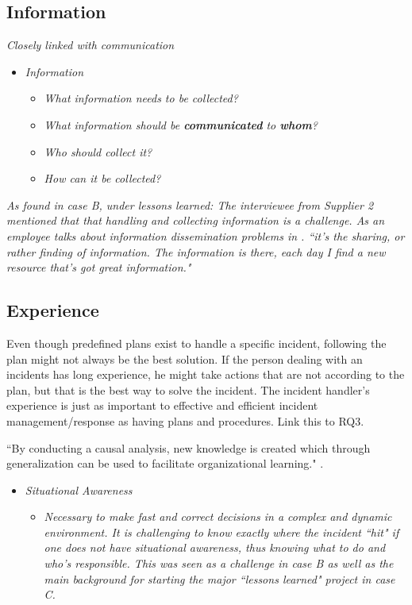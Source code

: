 \subsection{Information}
\textit{Closely linked with communication}

\begin{itemize}
\item \textit{Information}
\begin{itemize}
\item \textit{What information needs to be collected?}
\item \textit{What information should be \textbf{communicated} to \textbf{whom}?}
\item \textit{Who should collect it?}
\item \textit{How can it be collected?}
\end{itemize}
\end{itemize}

\textit{As found in case B, under lessons learned:
The interviewee from Supplier 2 mentioned that that handling and collecting information is a challenge. As an employee talks about information dissemination problems in \cite{ahmad2012incident}.
``it's the sharing, or rather finding of information. The information is there, each day I find a new resource that's got great information."}

\subsection{Experience}

Even though predefined plans exist to handle a specific incident, following the plan might not always be the best solution. If the person dealing with an incidents has long experience, he might take actions that are not according to the plan, but that is the best way to solve the incident. The incident handler's experience is just as important to effective and efficient incident management/response as having plans and procedures. Link this to RQ3.

``By conducting a causal analysis, new knowledge is created which through generalization can be used to facilitate organizational learning."\cite{werlinger2010preparation}
.

\begin{itemize}
\item \textit{Situational Awareness}
\begin{itemize}
\item\textit{ Necessary to make fast and correct decisions in a complex and dynamic environment. It is challenging to know exactly where the incident ``hit" if one does not have situational awareness, thus knowing what to do and who's responsible. This was  seen as a challenge in case B as well as the main background for starting the major ``lessons learned" project in case C.}
\end{itemize}
\end{itemize}

